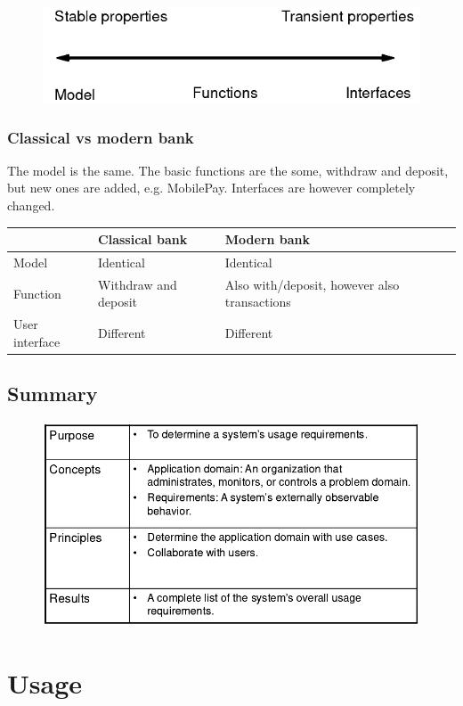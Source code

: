 \begin{figure}[H]
    \centering
    \includegraphics[width=.6\textwidth]{figures/properties.png}
\end{figure}

\subsubsection{Classical vs modern bank}
The model is the same. The basic functions are the some, withdraw and deposit, but new ones are added, e.g. MobilePay. Interfaces are however completely changed.
\begin{table}[h]
\centering
\begin{tabular}{|l|l|l|}
\hline
 & Classical bank & Modern bank \\ \hline
Model & Identical & Identical \\ \hline
Function & Withdraw and deposit & Also with/deposit, however also transactions \\ \hline
User interface & Different & Different \\ \hline
\end{tabular}
\end{table}

\subsection{Summary}
\begin{figure}[H]
    \centering
    \includegraphics[width=.6\textwidth]{figures/apdomainsummary.png}
\end{figure}

\section{Usage}
